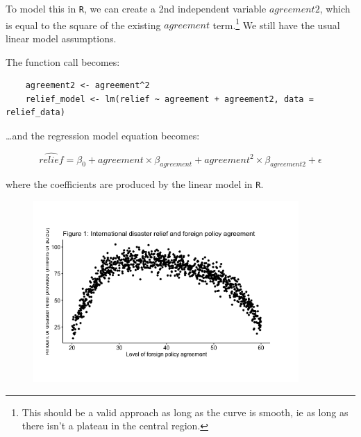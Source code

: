 \documentclass[12pt,letterpaper]{article}
\begin{document}
  To model this in \texttt{R}, we can create a 2nd independent variable $agreement2$, which is equal to the square of the existing $agreement$ term.\footnote{This should be a valid approach as long as the curve is smooth, ie as long as there isn't a plateau in the central region.}  We still have the usual linear model assumptions.
  
  The function call becomes: 
  
  \begin{verbatim}
    agreement2 <- agreement^2
    relief_model <- lm(relief ~ agreement + agreement2, data = relief_data)
  \end{verbatim}
  
  \ldots and the regression model equation becomes:
  
  \[ \widehat{relief} = \beta_0 + agreement \times \beta_{agreement} + agreement^2 \times \beta_{agreement2} + \epsilon\]
  
  where the coefficients are produced by the linear model in \texttt{R}.


	    \begin{figure}
		    \includegraphics[width=0.9\textwidth]{q6.png}
		    \label{fig:pres_inc_prof}
	    \end{figure}

\clearpage
\end{document}
